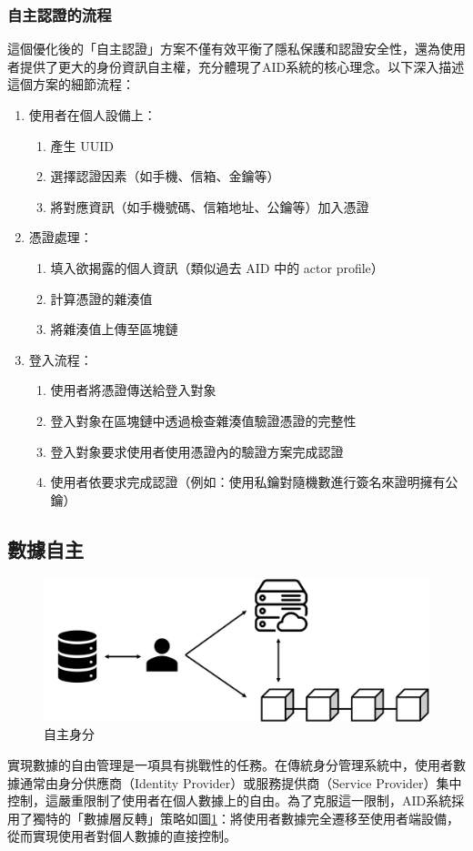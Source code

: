 \subsubsection{自主認證的流程}
這個優化後的「自主認證」方案不僅有效平衡了隱私保護和認證安全性，還為使用者提供了更大的身份資訊自主權，充分體現了AID系統的核心理念。以下深入描述這個方案的細節流程：
\begin{enumerate}
  \item 使用者在個人設備上：
        \begin{enumerate}
          \item 產生 UUID
          \item 選擇認證因素（如手機、信箱、金鑰等）
          \item 將對應資訊（如手機號碼、信箱地址、公鑰等）加入憑證
        \end{enumerate}

  \item 憑證處理：
        \begin{enumerate}
          \item 填入欲揭露的個人資訊（類似過去 AID 中的 actor profile）
          \item 計算憑證的雜湊值
          \item 將雜湊值上傳至區塊鏈
        \end{enumerate}

  \item 登入流程：
        \begin{enumerate}
          \item 使用者將憑證傳送給登入對象
          \item 登入對象在區塊鏈中透過檢查雜湊值驗證憑證的完整性
          \item 登入對象要求使用者使用憑證內的驗證方案完成認證
          \item 使用者依要求完成認證（例如：使用私鑰對隨機數進行簽名來證明擁有公鑰）
        \end{enumerate}
\end{enumerate}
\subsection{數據自主}
\begin{figure}
  \centering
  \includegraphics[width=\linewidth,keepaspectratio]{figures/aid.png}
  \caption{自主身分}
  \label{fig:aid}
\end{figure}
實現數據的自由管理是一項具有挑戰性的任務。在傳統身分管理系統中，使用者數據通常由身分供應商（Identity Provider）或服務提供商（Service Provider）集中控制，這嚴重限制了使用者在個人數據上的自由。為了克服這一限制，AID系統採用了獨特的「數據層反轉」策略如圖\ref{fig:aid}：將使用者數據完全遷移至使用者端設備，從而實現使用者對個人數據的直接控制。


